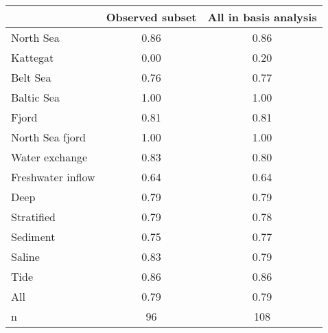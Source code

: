 \begin{tabular}{lcc}
\toprule
 & Observed subset & All in basis analysis \\
\midrule
North Sea & 0.86 & 0.86 \\
Kattegat & 0.00 & 0.20 \\
Belt Sea & 0.76 & 0.77 \\
Baltic Sea & 1.00 & 1.00 \\
Fjord & 0.81 & 0.81 \\
North Sea fjord & 1.00 & 1.00 \\
Water exchange & 0.83 & 0.80 \\
Freshwater inflow & 0.64 & 0.64 \\
Deep & 0.79 & 0.79 \\
Stratified & 0.79 & 0.78 \\
Sediment & 0.75 & 0.77 \\
Saline & 0.83 & 0.79 \\
Tide & 0.86 & 0.86 \\
All & 0.79 & 0.79 \\
n & 96 & 108 \\
\bottomrule
\end{tabular}

